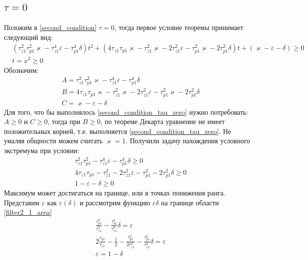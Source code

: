 \documentclass[a4paper,14pt]{extarticle} %
\begin{document}
\subsection{$\tau = 0$}
Положим в \eqref{second_condition} $\tau = 0$, тогда первое условие теоремы принимает следующий вид:
 \begin{equation}\label{second_condition_tau_zero}
 \begin{aligned}
&(\tau_{z1}^2\tau_{p1}^2\varkappa - \tau_{z1}^4\varepsilon - \tau_{p1}^4\delta)t^2 +( 4\tau_{z1}\tau_{p1}\varkappa - \tau_{z1}^2\varkappa - 2\tau_{z1}^2\varepsilon - \tau_{p1}^2\varkappa - 2\tau_{p1}^2\delta)t + (\varkappa-\varepsilon - \delta)  \geq 0\\
&t = x^2 \geq 0
 \end{aligned}
\end{equation}
Обозначим:
 \begin{equation}
 \begin{aligned}
&A = \tau_{z1}^2\tau_{p1}^2\varkappa - \tau_{z1}^4\varepsilon - \tau_{p1}^4\delta\\
&B = 4\tau_{z1}\tau_{p1}\varkappa - \tau_{z1}^2\varkappa - 2\tau_{z1}^2\varepsilon - \tau_{p1}^2\varkappa - 2\tau_{p1}^2\delta\\
&C = \varkappa-\varepsilon - \delta
 \end{aligned}
\end{equation}
Для того, что бы выполнялось \eqref{second_condition_tau_zero} нужно потребовать: $A \geq 0$ и $C \geq 0$, тогда  при $B \geq 0$, по теореме Декарта уравнение не имеет положительных корней, т.е. выполняется \eqref{second_condition_tau_zero}. Не умаляя общности можем считать $\varkappa = 1$. Получили задачу нахождения условного экстремума при условии:
 \begin{equation}\label{filter2_1_area}
 \begin{aligned}
&\tau_{z1}^2\tau_{p1}^2 - \tau_{z1}^4\varepsilon - \tau_{p1}^4\delta \geq 0\\
&4\tau_{z1}\tau_{p1} - \tau_{z1}^2 - 2\tau_{z1}^2\varepsilon - \tau_{p1}^2 - 2\tau_{p1}^2\delta \geq 0\\
&1-\varepsilon - \delta \geq 0
 \end{aligned}
\end{equation}
Максимум может достигаться на границе, или в точках понижения ранга. Представим $\varepsilon$ как $\varepsilon(\delta)$ и рассмотрим функцию $\varepsilon\delta$ на границе области \eqref{filter2_1_area}
 \begin{equation}\label{filter2_1_area_border}
 \begin{aligned}
&\frac{\tau_{p1}^2}{\tau_{z1}^2} - \frac{\tau_{p1}^4}{\tau_{z1}^4}\delta =\varepsilon\\
&2\frac{\tau_{p1}}{\tau_{z1}} - \frac{1}{2} - \frac{\tau_{p1}^2}{2\tau_{z1}^2} - \frac{\tau_{p1}^2}{\tau_{z1}^2}\delta =  \varepsilon\\
&\varepsilon = 1 - \delta
 \end{aligned}
\end{equation}
\end{document}
